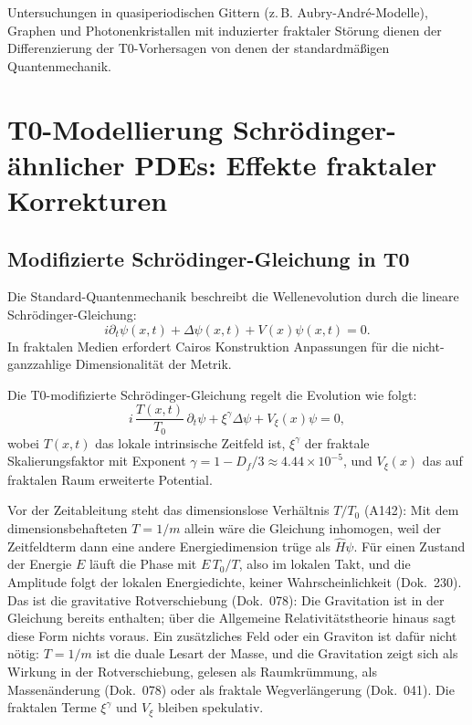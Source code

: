 	Untersuchungen in quasiperiodischen Gittern (z.\,B. Aubry-André-Modelle), Graphen und Photonenkristallen mit induzierter fraktaler Störung dienen der Differenzierung der T0-Vorhersagen von denen der standardmäßigen Quantenmechanik.
	
	\section{T0-Modellierung Schrödinger-ähnlicher PDEs: Effekte fraktaler Korrekturen}
	
	\subsection{Modifizierte Schrödinger-Gleichung in T0}
	
	Die Standard-Quantenmechanik beschreibt die Wellenevolution durch die lineare Schrödinger-Gleichung:
	\begin{equation}
		i \partial_t \psi(x,t) + \Delta \psi(x,t) + V(x)\psi(x,t) = 0.
	\end{equation}
	In fraktalen Medien erfordert Cairos Konstruktion Anpassungen für die nicht-ganzzahlige Dimensionalität der Metrik.
	
	Die T0-modifizierte Schrödinger-Gleichung regelt die Evolution wie folgt:
	\begin{equation}
		i\, \frac{T(x,t)}{T_0}\, \partial_t \psi + \xi^\gamma \Delta \psi + V_\xi(x)\psi = 0,
	\end{equation}
	wobei $T(x,t)$ das lokale intrinsische Zeitfeld ist, $\xi^\gamma$ der fraktale Skalierungsfaktor mit Exponent $\gamma = 1 - D_f/3 \approx 4.44 \times 10^{-5}$, und $V_\xi(x)$ das auf fraktalen Raum erweiterte Potential.

	Vor der Zeitableitung steht das dimensionslose Verhältnis $T/T_0$ (A142): Mit dem dimensionsbehafteten $T=1/m$ allein wäre die Gleichung inhomogen, weil der Zeitfeldterm dann eine andere Energiedimension trüge als $\hat H\psi$. Für einen Zustand der Energie $E$ läuft die Phase mit $E\,T_0/T$, also im lokalen Takt, und die Amplitude folgt der lokalen Energiedichte, keiner Wahrscheinlichkeit (Dok.~230). Das ist die gravitative Rotverschiebung (Dok.~078): Die Gravitation ist in der Gleichung bereits enthalten; über die Allgemeine Relativitätstheorie hinaus sagt diese Form nichts voraus. Ein zusätzliches Feld oder ein Graviton ist dafür nicht nötig: $T=1/m$ ist die duale Lesart der Masse, und die Gravitation zeigt sich als Wirkung in der Rotverschiebung, gelesen als Raumkrümmung, als Massenänderung (Dok.~078) oder als fraktale Wegverlängerung (Dok.~041). Die fraktalen Terme $\xi^\gamma$ und $V_\xi$ bleiben spekulativ.
	
